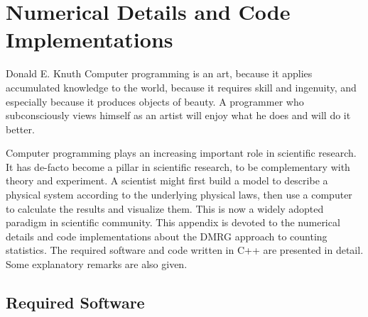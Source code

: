 \chapter{Numerical Details and Code Implementations}\label{chap:code}


\begin{PKUquote}{Donald E. Knuth}
Computer programming is an art, because it applies accumulated knowledge to the world, because it requires skill and ingenuity, and especially because it produces objects of beauty. A programmer who subconsciously views himself as an artist will enjoy what he does and will do it better.
\end{PKUquote}





\noindent Computer programming plays an increasing important role in scientific research. It has de-facto become a pillar in scientific research, to be complementary with theory and experiment. A scientist might first build a model to describe a physical system according to the underlying physical laws, then use a computer to calculate the results and visualize them. This is now a widely adopted paradigm in scientific community. This appendix is devoted to the numerical details and code implementations about the DMRG approach to counting statistics. The required software and code written in C++ are presented in detail. Some explanatory remarks are also given.






\section*{Required Software}


